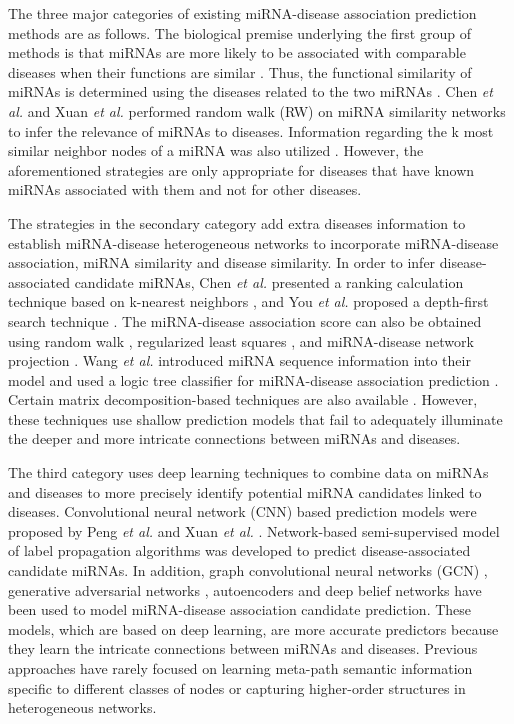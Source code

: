 \documentclass[journal,twoside,web]{ieeecolor}
\begin{document}
The three major categories of existing miRNA-disease association prediction methods are as follows. The biological premise underlying the first group of methods is that miRNAs are more likely to be associated with comparable diseases when their functions are similar \cite{2019Adaptive}. Thus, the functional similarity of miRNAs is determined using the diseases related to the two miRNAs \cite{2010Inferring}. Chen {\it et al.} \cite{2012RWRMDA} and Xuan {\it et al.} \cite{2015Prediction} performed random walk (RW) on miRNA similarity networks to infer the relevance of miRNAs to diseases. Information regarding the k most similar neighbor nodes of a miRNA was also utilized \cite{2013Prediction}. However, the aforementioned strategies are only appropriate for diseases that have known miRNAs associated with them and not for other diseases.

The strategies in the secondary category add extra diseases information to establish miRNA-disease heterogeneous networks to incorporate miRNA-disease association, miRNA similarity and disease similarity. In order to infer disease-associated candidate miRNAs, Chen {\it et al.} presented a ranking calculation technique based on k-nearest neighbors \cite{2017RKNNMDA}, and You {\it et al.} proposed a depth-first search technique \cite{2017PBMDA}. The miRNA-disease association score can also be obtained using random walk \cite{2021A, 2016Inferring,2017A , 2018Global}, regularized least squares \cite{2015Semi}, and miRNA-disease network projection \cite{2016Network, Chen2018BNPMDA}. Wang {\it et al.} introduced miRNA sequence information into their model and used a logic tree classifier for miRNA-disease association prediction \cite{2019LMTRDA}. Certain matrix decomposition-based techniques are also available \cite{20, 21, Ping2018Inferring, 2020NCMCMDA, 2018MDHGI}. However, these techniques use shallow prediction models that fail to adequately illuminate the deeper and more intricate connections between miRNAs and diseases.

The third category uses deep learning techniques to combine data on miRNAs and diseases to more precisely identify potential miRNA candidates linked to diseases. Convolutional neural network (CNN) based prediction models were proposed by Peng {\it et al.} \cite{Jiajie2019A} and Xuan {\it et al.} \cite{Ping2018Dual}. Network-based semi-supervised model of label propagation algorithms \cite{27} was developed to predict disease-associated candidate miRNAs. In addition, graph convolutional neural networks (GCN) \cite{2020FCGCNMDA, 2020Heterogeneous, 2020Neural}, generative adversarial networks \cite{0Integration}, autoencoders \cite{0AEMDA,33} and deep belief networks \cite{34} have been used to model miRNA-disease association candidate prediction. These models, which are based on deep learning, are more accurate predictors because they learn the intricate connections between miRNAs and diseases. Previous approaches have rarely focused on learning meta-path semantic information specific to different classes of nodes or capturing higher-order structures in heterogeneous networks.
\end{document}

